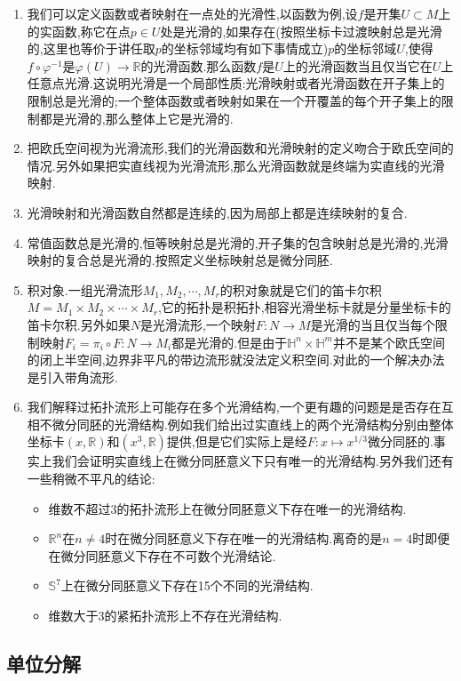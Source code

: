 \begin{enumerate}
	\item 我们可以定义函数或者映射在一点处的光滑性,以函数为例,设$f$是开集$U\subset M$上的实函数,称它在点$p\in U$处是光滑的,如果存在(按照坐标卡过渡映射总是光滑的,这里也等价于讲任取$p$的坐标邻域均有如下事情成立)$p$的坐标邻域$U$,使得$f\circ\varphi^{-1}$是$\varphi(U)\to\mathbb{R}$的光滑函数.那么函数$f$是$U$上的光滑函数当且仅当它在$U$上任意点光滑.这说明光滑是一个局部性质:光滑映射或者光滑函数在开子集上的限制总是光滑的;一个整体函数或者映射如果在一个开覆盖的每个开子集上的限制都是光滑的,那么整体上它是光滑的.
	\item 把欧氏空间视为光滑流形,我们的光滑函数和光滑映射的定义吻合于欧氏空间的情况.另外如果把实直线视为光滑流形,那么光滑函数就是终端为实直线的光滑映射.
	\item 光滑映射和光滑函数自然都是连续的,因为局部上都是连续映射的复合.
	\item 常值函数总是光滑的,恒等映射总是光滑的,开子集的包含映射总是光滑的,光滑映射的复合总是光滑的.按照定义坐标映射总是微分同胚.
	\item 积对象.一组光滑流形$M_1,M_2,\cdots,M_r$的积对象就是它们的笛卡尔积$M=M_1\times M_2\times\cdots\times M_r$,它的拓扑是积拓扑,相容光滑坐标卡就是分量坐标卡的笛卡尔积.另外如果$N$是光滑流形,一个映射$F:N\to M$是光滑的当且仅当每个限制映射$F_i=\pi_i\circ F:N\to M_i$都是光滑的.但是由于$\mathbb{H}^n\times\mathbb{H}^m$并不是某个欧氏空间的闭上半空间,边界非平凡的带边流形就没法定义积空间.对此的一个解决办法是引入带角流形.
	\item 我们解释过拓扑流形上可能存在多个光滑结构,一个更有趣的问题是是否存在互相不微分同胚的光滑结构.例如我们给出过实直线上的两个光滑结构分别由整体坐标卡$(x,\mathbb{R})$和$(x^3,\mathbb{R})$提供,但是它们实际上是经$F:x\mapsto x^{1/3}$微分同胚的.事实上我们会证明实直线上在微分同胚意义下只有唯一的光滑结构.另外我们还有一些稍微不平凡的结论:
	\begin{itemize}
		\item 维数不超过3的拓扑流形上在微分同胚意义下存在唯一的光滑结构.
		\item $\mathbb{R}^n$在$n\not=4$时在微分同胚意义下存在唯一的光滑结构.离奇的是$n=4$时即便在微分同胚意义下存在不可数个光滑结论.
		\item $\mathbb{S}^7$上在微分同胚意义下存在15个不同的光滑结构.
		\item 维数大于3的紧拓扑流形上不存在光滑结构.
	\end{itemize}
\end{enumerate}

\subsection{单位分解}

